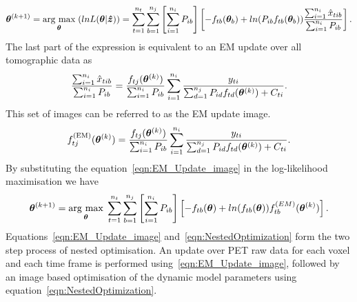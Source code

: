 \begin{equation}
\bm{\theta}^{(k+1)} = \underset{\bm{\theta}}{\operatorname{arg}\,\operatorname{max}}\;(lnL(\bm{\theta}|\bm{\hat{z}})) = 
\sum_{t=1}^{n_t} \sum_{b=1}^{n_j} \left[ \sum_{i=1}^{n_i}  P_{ib} \right]
\left[ -f_{tb}(\bm\theta_b) + 
ln(P_{ib} f_{tb}(\bm\theta_b)) 
\frac{\sum_{i=1}^{n_i} \hat{x}_{tib} }
{ \sum_{i=1}^{n_i}  P_{ib} }
\right] \\ .
\end{equation}
The last part of the expression is equivalent to an EM update over all tomographic data as 
\begin{equation}
\frac{\sum_{i=1}^{n_i} \hat{x}_{tib} }
{\sum_{i=1}^{n_i}  P_{ib}}  =
\frac{f_{tj}(\bm\theta^{(k)})}{\sum_{i=1}^{n_i}  P_{ib}}
\sum_{i=1}^{n_i} 
\frac{y_{ti}}
{\sum_{d=1}^{n_j} P_{id} f_{td}(\bm\theta^{(k)}) + C_{ti}}\\.
\end{equation}
This set of images can be referred to as the EM update image.
\begin{equation}
f_{tj}^{(\textrm{EM})}(\bm{\theta}^{(k)}) = 
\frac{f_{tj}(\bm\theta^{(k)})}{\sum_{i=1}^{n_i}  P_{ib}}
\sum_{i=1}^{n_i} 
\frac{y_{ti}}
{\sum_{d=1}^{n_j} P_{id} f_{td}(\bm\theta^{(k)}) + C_{ti}}\\.
\label{eqn:EM_Update_image}
\end{equation}
By substituting the equation~\ref{eqn:EM_Update_image} in the log-likelihood maximisation we have
\begin{equation}
\bm{\theta}^{(k+1)} = 
\underset{\bm{\theta}}{\operatorname{arg}\,\operatorname{max}}\;
\sum_{t=1}^{n_t} \sum_{b=1}^{n_j} \left[ \sum_{i=1}^{n_i}  P_{ib} \right]
\left[ -f_{tb}(\bm\theta) + 
ln( f_{tb}(\bm\theta)) 
f_{tb}^{(EM)}(\bm{\theta}^{(k)})
\right] \\ .
\label{eqn:NestedOptimization}
\end{equation}
Equations~\ref{eqn:EM_Update_image} and~\ref{eqn:NestedOptimization} form the two step process of nested optimisation. An update over PET raw data for each voxel and each time frame is performed using~\ref{eqn:EM_Update_image}, followed by an image based optimisation of the dynamic model parameters using equation~\ref{eqn:NestedOptimization}. 

